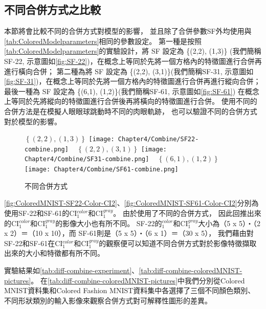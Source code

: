 \documentclass[class=NCU\_thesis, crop=false]{standalone}
\begin{document}
    \pagebreak

    \subsection{不同合併方式之比較}
    本節將會比較不同的合併方式對模型的影響，
    並且除了合併參數SF外均使用與\cref{tab:ColoredModelparameters}相同的參數設定。
    第一種是按照\cref{tab:ColoredModelparameters}的實驗設計，將 SF 設定為 \{(2,2), (1,3)\}
    (我們簡稱SF-22, 示意圖如\cref{fig:SF-22})，在概念上等同於先將一個方格內的特徵圖進行合併再進行橫向合併；
    第二種為將 SF 設定為 \{(2,2), (3,1)\}(我們簡稱SF-31, 示意圖如\cref{fig:SF-31})，在概念上等同於先將一個方格內的特徵圖進行合併再進行縱向合併；
    最後一種為 SF 設定為 \{(6,1), (1,2)\}(我們簡稱SF-61, 示意圖如\cref{fig:SF-61})
    在概念上等同於先將縱向的特徵圖進行合併後再將橫向的特徵圖進行合併。
    使用不同的合併方法是在模擬人眼眼球跳動時不同的肉眼軌跡，
    也可以驗證不同的合併方式對於模型的影響。

    \begin{figure}[H]
        \subcaptionbox
            {$\left\{(2, 2), (1, 3)\right\}$
            \label{fig:SF-22}}
            {\texttt{[image: Chapter4/Combine/SF22-combine.png]}}
        ~
        \subcaptionbox
            {$\left\{(2, 2), (3, 1)\right\}$
            \label{fig:SF-31}}
            {\texttt{[image: Chapter4/Combine/SF31-combine.png]}}
        ~
        \subcaptionbox
            {$\left\{(6, 1), (1, 2)\right\}$
            \label{fig:SF-61}}
            {\texttt{[image: Chapter4/Combine/SF61-combine.png]}}
        ~
        \caption{不同合併方式}
        \label{fig:SF}
    \end{figure}

	\cref{fig:ColoredMNIST-SF22-Color-CI2}、\cref{fig:ColoredMNIST-SF61-Color-CI2}分別為使用SF-22和SF-61的CI$^{color}_{1}$和CI$^{gray}_{1}$。
	由於使用了不同的合併方式，
	因此回推出來的CI$^{color}_{1}$和CI$^{gray}_{1}$的影像大小也有所不同。
	SF-22的$^{color}_{1}$和CI$^{gray}_{1}$大小為（5 x 5）‧（2 x 2）＝（10 x 10），而
    SF-61則是（5 x 5）‧（6 x 1）＝（30 x 5），
    我們藉由對SF-22和SF-61在CI$^{color}_{1}$和CI$^{gray}_{1}$的觀察便可以知道不同合併方式對於影像特徵擷取出來的大小和特徵都有所不同。

    實驗結果如\cref{tab:diff-combine-experiment}、\cref{tab:diff-combine-coloredMNIST-pictures}。 在\cref{tab:diff-combine-coloredMNIST-pictures}中我們分別從Colored MNIST資料集和Colored Fashion MNIST資料集中各選擇了三個不同顏色類別、不同形狀類別的輸入影像來觀察合併方式對可解釋性圖形的差異。
\end{document}
